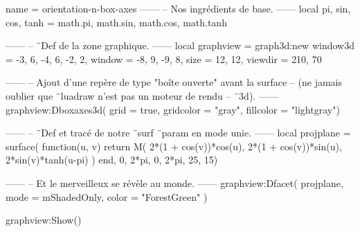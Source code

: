 \documentclass{standalone}
\begin{document}
\begin{luadraw}{name = orientation-n-box-axes}
------
-- Nos ingrédients de base.
------
local pi, sin, cos, tanh = math.pi, math.sin, math.cos, math.tanh

------
-- ¨Def de la zone graphique.
------
local graphview = graph3d:new{
  window3d = {-3, 6, -4, 6, -2, 2},
  window   = {-8, 9, -9, 8},
  size     = {12, 12},
  viewdir  = {210, 70}
}

------
-- Ajout d'une repère de type "boîte ouverte" avant la surface
-- (ne jamais oublier que ¨luadraw n'est pas un moteur de rendu
-- ¨3d).
------
graphview:Dboxaxes3d({
  grid      = true,
  gridcolor = "gray",
  fillcolor = "lightgray"})

------
-- ¨Def et tracé de notre ¨surf ¨param en mode unie.
------
local projplane = surface(
  function(u, v)
    return M(
      2*(1 + cos(v))*cos(u),
      2*(1 + cos(v))*sin(u),
      2*sin(v)*tanh(u-pi)
    )
  end,
  0, 2*pi, 0, 2*pi,
  {25, 15})

------
-- Et le merveilleux se révèle au monde.
------
graphview:Dfacet(
  projplane,
  {
    mode  = mShadedOnly,
    color = "ForestGreen"
  })

graphview:Show()
\end{luadraw}
\end{document}
